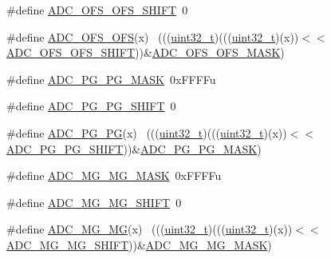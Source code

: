 \begin{DoxyCompactItemize}
\item 
\#define \hyperlink{group___a_d_c___register___masks_ga86de5d25a5433db6e96700e2d000ad07}{A\+D\+C\+\_\+\+O\+F\+S\+\_\+\+O\+F\+S\+\_\+\+S\+H\+I\+FT}~0
\item 
\#define \hyperlink{group___a_d_c___register___masks_ga05a86dc2179bf28986dac6c3b8f2ad86}{A\+D\+C\+\_\+\+O\+F\+S\+\_\+\+O\+FS}(x)                                                  ~(((\hyperlink{_p_e___types_8h_a33594304e786b158f3fb30289278f5af}{uint32\+\_\+t})(((\hyperlink{_p_e___types_8h_a33594304e786b158f3fb30289278f5af}{uint32\+\_\+t})(x))$<$$<$\hyperlink{group___a_d_c___register___masks_ga86de5d25a5433db6e96700e2d000ad07}{A\+D\+C\+\_\+\+O\+F\+S\+\_\+\+O\+F\+S\+\_\+\+S\+H\+I\+FT}))\&\hyperlink{group___a_d_c___register___masks_ga1532ae43eb63d6c071f531cca89fdb68}{A\+D\+C\+\_\+\+O\+F\+S\+\_\+\+O\+F\+S\+\_\+\+M\+A\+SK})
\item 
\#define \hyperlink{group___a_d_c___register___masks_ga0619279d8dcf43af1fda9f27090ae51b}{A\+D\+C\+\_\+\+P\+G\+\_\+\+P\+G\+\_\+\+M\+A\+SK}~0x\+F\+F\+F\+Fu
\item 
\#define \hyperlink{group___a_d_c___register___masks_ga014623fb35c473d12ff7fc64c3e8cfe3}{A\+D\+C\+\_\+\+P\+G\+\_\+\+P\+G\+\_\+\+S\+H\+I\+FT}~0
\item 
\#define \hyperlink{group___a_d_c___register___masks_gaee91977cfc6901ece0f38f9129a6bb8d}{A\+D\+C\+\_\+\+P\+G\+\_\+\+PG}(x)                                                      ~(((\hyperlink{_p_e___types_8h_a33594304e786b158f3fb30289278f5af}{uint32\+\_\+t})(((\hyperlink{_p_e___types_8h_a33594304e786b158f3fb30289278f5af}{uint32\+\_\+t})(x))$<$$<$\hyperlink{group___a_d_c___register___masks_ga014623fb35c473d12ff7fc64c3e8cfe3}{A\+D\+C\+\_\+\+P\+G\+\_\+\+P\+G\+\_\+\+S\+H\+I\+FT}))\&\hyperlink{group___a_d_c___register___masks_ga0619279d8dcf43af1fda9f27090ae51b}{A\+D\+C\+\_\+\+P\+G\+\_\+\+P\+G\+\_\+\+M\+A\+SK})
\item 
\#define \hyperlink{group___a_d_c___register___masks_ga9f415258af1bad0159dd605efccd043b}{A\+D\+C\+\_\+\+M\+G\+\_\+\+M\+G\+\_\+\+M\+A\+SK}~0x\+F\+F\+F\+Fu
\item 
\#define \hyperlink{group___a_d_c___register___masks_ga4b2717da089f0de5bd41ef91001b7cfe}{A\+D\+C\+\_\+\+M\+G\+\_\+\+M\+G\+\_\+\+S\+H\+I\+FT}~0
\item 
\#define \hyperlink{group___a_d_c___register___masks_gac6b5db2e032965ca7bf626469aaeb8c3}{A\+D\+C\+\_\+\+M\+G\+\_\+\+MG}(x)                                                      ~(((\hyperlink{_p_e___types_8h_a33594304e786b158f3fb30289278f5af}{uint32\+\_\+t})(((\hyperlink{_p_e___types_8h_a33594304e786b158f3fb30289278f5af}{uint32\+\_\+t})(x))$<$$<$\hyperlink{group___a_d_c___register___masks_ga4b2717da089f0de5bd41ef91001b7cfe}{A\+D\+C\+\_\+\+M\+G\+\_\+\+M\+G\+\_\+\+S\+H\+I\+FT}))\&\hyperlink{group___a_d_c___register___masks_ga9f415258af1bad0159dd605efccd043b}{A\+D\+C\+\_\+\+M\+G\+\_\+\+M\+G\+\_\+\+M\+A\+SK})
$$
\end{DoxyCompactItemize}
